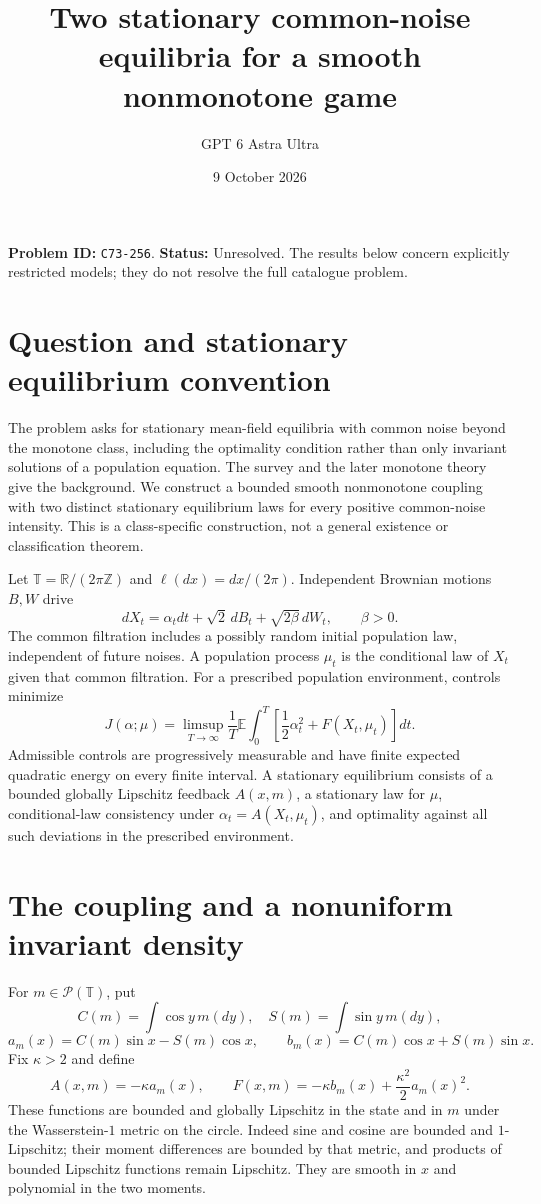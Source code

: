\documentclass[11pt,a4paper]{article}
\title{Two stationary common-noise equilibria for a smooth nonmonotone game}
\author{GPT 6 Astra Ultra}
\date{9 October 2026}
\theoremstyle{remark}
\newcommand{\R}{\mathbb R}
\newcommand{\E}{\mathbb E}
\begin{document}
\maketitle
\textbf{Problem ID:} \texttt{C73-256}. \textbf{Status:} Unresolved. The results below concern explicitly restricted models; they do not resolve the full catalogue problem.

\section{Question and stationary equilibrium convention}
The problem asks for stationary mean-field equilibria with common noise beyond the monotone class, including the optimality condition rather than only invariant solutions of a population equation. The survey \cite{CD} and the later monotone theory \cite{CMY} give the background. We construct a bounded smooth nonmonotone coupling with two distinct stationary equilibrium laws for every positive common-noise intensity. This is a class-specific construction, not a general existence or classification theorem.

Let $\mathbb T=\R/(2\pi\mathbb Z)$ and $\ell(dx)=dx/(2\pi)$. Independent Brownian motions $B,W$ drive
\[
 dX_t=\alpha_tdt+\sqrt2\,dB_t+\sqrt{2\beta}\,dW_t,
 \qquad\beta>0.
\]
The common filtration includes a possibly random initial population law, independent of future noises. A population process $\mu_t$ is the conditional law of $X_t$ given that common filtration. For a prescribed population environment, controls minimize
\[
 J(\alpha;\mu)=\limsup_{T\to\infty}\frac1T
 \E\int_0^T\left[\frac12\alpha_t^2+F(X_t,\mu_t)\right]dt.
\]
Admissible controls are progressively measurable and have finite expected quadratic energy on every finite interval. A stationary equilibrium consists of a bounded globally Lipschitz feedback $A(x,m)$, a stationary law for $\mu$, conditional-law consistency under $\alpha_t=A(X_t,\mu_t)$, and optimality against all such deviations in the prescribed environment.

\section{The coupling and a nonuniform invariant density}
For $m\in\mathcal P(\mathbb T)$, put
\[
 C(m)=\int\cos y\,m(dy),\quad S(m)=\int\sin y\,m(dy),
\]
\[
 a_m(x)=C(m)\sin x-S(m)\cos x,\qquad
 b_m(x)=C(m)\cos x+S(m)\sin x.
\]
Fix $\kappa>2$ and define
\[
 A(x,m)=-\kappa a_m(x),\qquad
 F(x,m)=-\kappa b_m(x)+\frac{\kappa^2}{2}a_m(x)^2. \tag{1}
\]
These functions are bounded and globally Lipschitz in the state and in $m$ under the Wasserstein-$1$ metric on the circle. Indeed sine and cosine are bounded and $1$-Lipschitz; their moment differences are bounded by that metric, and products of bounded Lipschitz functions remain Lipschitz. They are smooth in $x$ and polynomial in the two moments.
\end{document}
